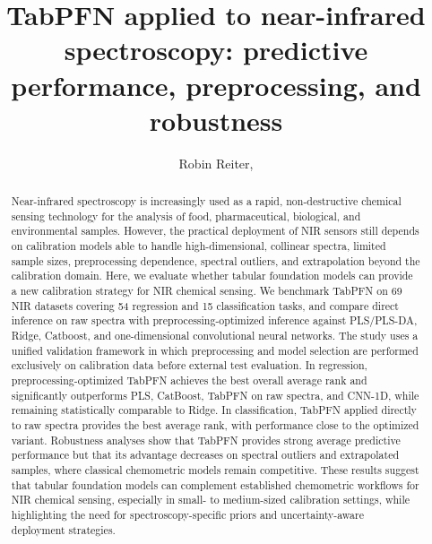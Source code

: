 \documentclass{article}
\title{TabPFN applied to near-infrared spectroscopy: predictive performance, preprocessing, and robustness}
\author{Robin Reiter, }
\begin{document}
{ \newcommand{\mynote}[3]{
     \fbox{\bfseries\sffamily\scriptsize#1}
       {\small$\blacktriangleright$\textsf{\textcolor{#3}{{\em #2}\bf }}$\blacktriangleleft$}}}
       { \newcommand{\mynote}[2]{}}

\newcommand{\denis}[1]{\mynote{Denis}{#1}{magenta}}
\newcommand{\lauriane}[1]{\mynote{Lauriane}{#1}{blue}}
\newcommand{\fab}[1]{\mynote{Fab}{#1}{red}}
\newcommand{\robin}[1]{\mynote{Robin}{#1}{brown}}
\newcommand{\greg}[1]{\mynote{Greg}{#1}{orange}}

\maketitle 

\begin{abstract}
Near-infrared spectroscopy is increasingly used as a rapid, non-destructive chemical sensing technology for the analysis of food, pharmaceutical, biological, and environmental samples. However, the practical deployment of NIR sensors still depends on calibration models able to handle high-dimensional, collinear spectra, limited sample sizes, preprocessing dependence, spectral outliers, and extrapolation beyond the calibration domain. Here, we evaluate whether tabular foundation models can provide a new calibration strategy for NIR chemical sensing. We benchmark TabPFN on 69 NIR datasets covering 54 regression and 15 classification tasks, and compare direct inference on raw spectra with preprocessing-optimized inference against PLS/PLS-DA, Ridge, Catboost, and one-dimensional convolutional neural networks. The study uses a unified validation framework in which preprocessing and model selection are performed exclusively on calibration data before external test evaluation. In regression, preprocessing-optimized TabPFN achieves the best overall average rank and significantly outperforms PLS, CatBoost, TabPFN on raw spectra, and CNN-1D, while remaining statistically comparable to Ridge. In classification, TabPFN applied directly to raw spectra provides the best average rank, with performance close to the optimized variant. Robustness analyses show that TabPFN provides strong average predictive performance but that its advantage decreases on spectral outliers and extrapolated samples, where classical chemometric models remain competitive. These results suggest that tabular foundation models can complement established chemometric workflows for NIR chemical sensing, especially in small- to medium-sized calibration settings, while highlighting the need for spectroscopy-specific priors and uncertainty-aware deployment strategies.
\end{abstract}
\end{document}
